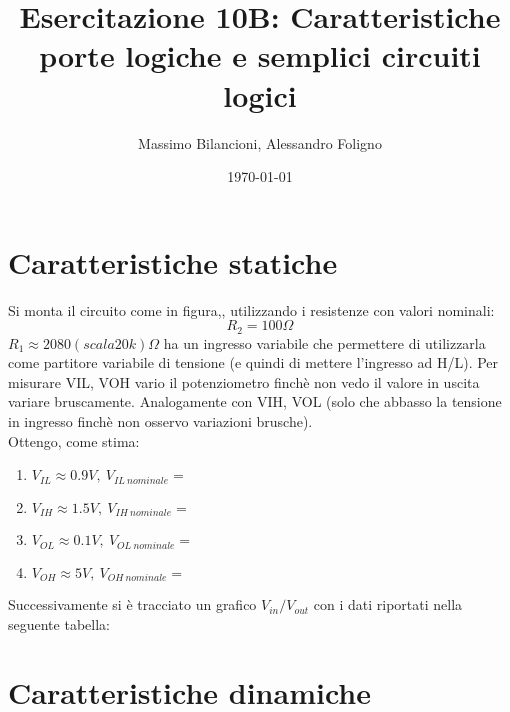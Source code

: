 \documentclass[10pt,a4paper]{article}
\date{\today}
\title{Esercitazione 10B: Caratteristiche porte logiche e semplici circuiti logici}
\author{Massimo Bilancioni, Alessandro Foligno}
\begin{document}
	\maketitle
	
	\section{Caratteristiche statiche}
	Si monta il circuito come in figura,, utilizzando i resistenze con valori nominali:\[R_2=100\Omega \]
	$R_1\approx2080(scala 20k)\Omega$ ha un ingresso variabile che permettere di utilizzarla come partitore variabile di tensione (e quindi di mettere l'ingresso ad H/L).
	Per misurare VIL, VOH vario il potenziometro finchè non vedo il valore in uscita variare bruscamente. Analogamente con VIH, VOL (solo che abbasso la tensione in ingresso finchè non osservo variazioni brusche).
	\\Ottengo, come stima:
	\begin{enumerate}
		\item $V_{IL}\approx0.9 V,~V_{IL~nominale}=$
		\item $V_{IH}		\approx 1.5V,~V_{IH~nominale}=$
		\item $V_{OL}\approx0.1V,~V_{OL~nominale}=$
		\item $V_{OH}\approx5V,~V_{OH~nominale}=$
	\end{enumerate}
	Successivamente si è tracciato un grafico $V_{in}/V_{out}$ con i dati riportati nella seguente tabella:
	\section{Caratteristiche dinamiche}
\end{document}
